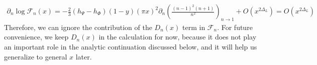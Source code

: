 \documentclass[11pt]{article}
\newcommand{\lb}{\left(}
\newcommand{\rb}{\right)}
\begin{document}
\begin{align}
\partial_n\log \mathcal{F}_n(x)=-\frac{2}{3}(h_\Psi-h_\Phi)(1-y)(\pi x)^2\partial_n \lb  \frac{(n-1)^2 (n+1)}{n^2}\rb_{n\to 1}+O(x^{2\Delta_L})=O(x^{2\Delta_L})
\end{align}
Therefore, we can ignore the contribution of the $D_n(x)$ term in $\mathcal{F}_n$. For future convenience, we keep $D_n(x)$ in the calculation for now, because it does not play an important role in the analytic continuation discussed below, and it will help us generalize to general $x$ later. 
\end{document}

